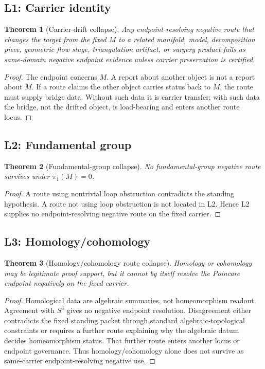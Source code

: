 \documentclass[11pt]{article}
\newtheorem{theorem}{Theorem}[section]
\newcommand{\Sthree}{S^{3}}
\begin{document}
\subsection{L1: Carrier identity}
\begin{theorem}[Carrier-drift collapse]
Any endpoint-resolving negative route that changes the target from the fixed \(M\) to a related manifold, model, decomposition piece, geometric flow stage, triangulation artifact, or surgery product fails as same-domain negative endpoint evidence unless carrier preservation is certified.
\end{theorem}
\begin{proof}
The endpoint concerns \(M\). A report about another object is not a report about \(M\). If a route claims the other object carries status back to \(M\), the route must supply bridge data. Without such data it is carrier transfer; with such data the bridge, not the drifted object, is load-bearing and enters another route locus.
\end{proof}

\subsection{L2: Fundamental group}
\begin{theorem}[Fundamental-group collapse]
No fundamental-group negative route survives under \(\pi_1(M)=0\).
\end{theorem}
\begin{proof}
A route using nontrivial loop obstruction contradicts the standing hypothesis. A route not using loop obstruction is not located in L2. Hence L2 supplies no endpoint-resolving negative route on the fixed carrier.
\end{proof}

\subsection{L3: Homology/cohomology}
\begin{theorem}[Homology/cohomology route collapse]
Homology or cohomology may be legitimate proof support, but it cannot by itself resolve the Poincare endpoint negatively on the fixed carrier.
\end{theorem}
\begin{proof}
Homological data are algebraic summaries, not homeomorphism readout. Agreement with \(\Sthree\) gives no negative endpoint resolution. Disagreement either contradicts the fixed standing packet through standard algebraic-topological constraints or requires a further route explaining why the algebraic datum decides homeomorphism status. That further route enters another locus or endpoint governance. Thus homology/cohomology alone does not survive as same-carrier endpoint-resolving negative use.
\end{proof}
\end{document}
